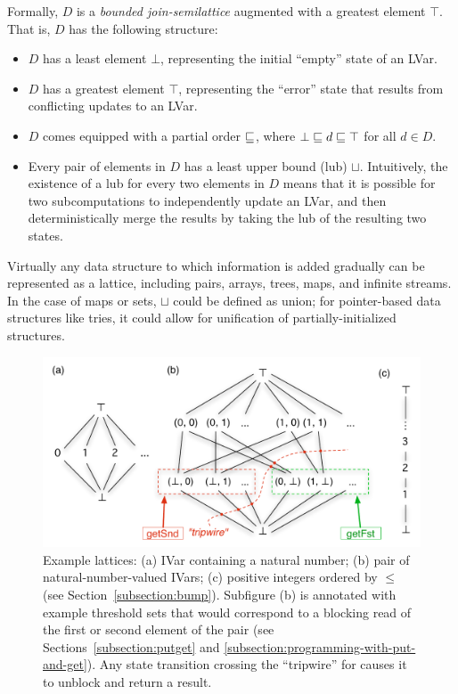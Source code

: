 Formally, $D$ is a \emph{bounded join-semilattice} augmented with a
greatest element $\top$.  That is, $D$ has the following structure:
\begin{itemize}
\item $D$ has a least element $\bot$, representing the initial
  ``empty'' state of an LVar.
\item $D$ has a greatest element $\top$, representing the ``error''
  state that results from conflicting updates to an LVar.
\item $D$ comes equipped with a partial order $\sqsubseteq$, where $\bot
  \sqsubseteq d \sqsubseteq \top$ for all $d \in D$.
\item Every pair of elements in $D$ has a least upper bound (lub)
  $\sqcup$.  Intuitively, the existence of a lub for every two
  elements in $D$ means that it is possible for two subcomputations to
  independently update an LVar, and then deterministically merge the
  results by taking the lub of the resulting two states.
\end{itemize}

\noindent Virtually any data structure to which information
is added gradually can be represented as a lattice, including pairs,
arrays, trees, maps, and infinite streams.  In the case of maps or
sets, $\sqcup$ could be defined as union; for pointer-based data
structures like tries, it could allow for unification of
partially-initialized structures.

\begin{figure}
\includegraphics[width=5in]{chapter2/figures/ExampleLattices2.pdf} 
  \caption{\footnotesize Example lattices: (a) IVar containing a
    natural number; (b) pair of natural-number-valued IVars; (c)
    positive integers ordered by $\leq$ (see
    Section~\ref{subsection:bump}).  Subfigure (b) is annotated with
    example threshold sets that would correspond to a blocking read of
    the first or second element of the pair (see
    Sections~\ref{subsection:putget}
    and \ref{subsection:programming-with-put-and-get}).  Any state
    transition crossing the ``tripwire'' for  causes
    it to unblock and return a result.}
    \label{f:lvars-example-lattices}
\end{figure}

